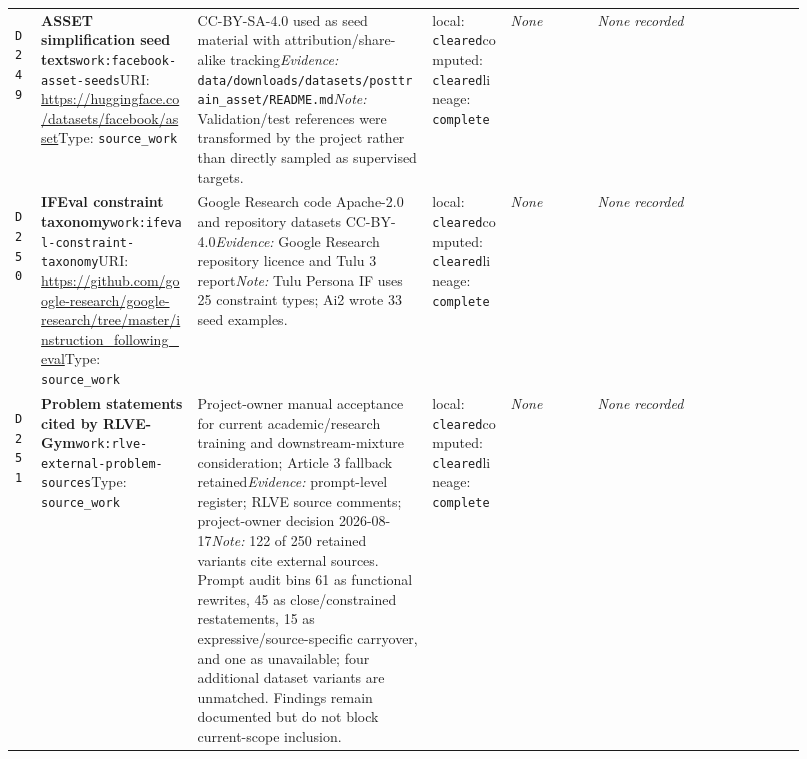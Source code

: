 \documentclass[9pt,a4paper]{article}
\newcommand{\depid}[1]{\hypertarget{dep:#1}{\texttt{#1}}}
\begin{document}
\begin{landscape}
\begin{longtable}{@{}L{0.035\linewidth}L{0.185\linewidth}L{0.27\linewidth}L{0.09\linewidth}L{0.10\linewidth}L{0.24\linewidth}@{}}
\depid{D249} & \textbf{ASSET simplification seed texts}\newline \nolinkurl{work:facebook-asset-seeds}\newline URI: \url{https://huggingface.co/datasets/facebook/asset}\newline Type: \texttt{source\_work} & CC-BY-SA-4.0 used as seed material with attribution/share-alike tracking\newline \textit{Evidence:} \nolinkurl{data/downloads/datasets/posttrain_asset/README.md}\newline \textit{Note:} Validation/test references were transformed by the project rather than directly sampled as supervised targets. & local: \texttt{cleared}\newline computed: \texttt{cleared}\newline lineage: \texttt{complete} & \textit{None} & \textit{None recorded} \\
\depid{D250} & \textbf{IFEval constraint taxonomy}\newline \nolinkurl{work:ifeval-constraint-taxonomy}\newline URI: \url{https://github.com/google-research/google-research/tree/master/instruction_following_eval}\newline Type: \texttt{source\_work} & Google Research code Apache-2.0 and repository datasets CC-BY-4.0\newline \textit{Evidence:} Google Research repository licence and Tulu 3 report\newline \textit{Note:} Tulu Persona IF uses 25 constraint types; Ai2 wrote 33 seed examples. & local: \texttt{cleared}\newline computed: \texttt{cleared}\newline lineage: \texttt{complete} & \textit{None} & \textit{None recorded} \\
\depid{D251} & \textbf{Problem statements cited by RLVE-Gym}\newline \nolinkurl{work:rlve-external-problem-sources}\newline Type: \texttt{source\_work} & Project-owner manual acceptance for current academic/research training and downstream-mixture consideration; Article 3 fallback retained\newline \textit{Evidence:} prompt-level register; RLVE source comments; project-owner decision 2026-08-17\newline \textit{Note:} 122 of 250 retained variants cite external sources. Prompt audit bins 61 as functional rewrites, 45 as close/constrained restatements, 15 as expressive/source-specific carryover, and one as unavailable; four additional dataset variants are unmatched. Findings remain documented but do not block current-scope inclusion. & local: \texttt{cleared}\newline computed: \texttt{cleared}\newline lineage: \texttt{complete} & \textit{None} & \textit{None recorded} \\

\end{longtable}
\end{landscape}
\end{document}
